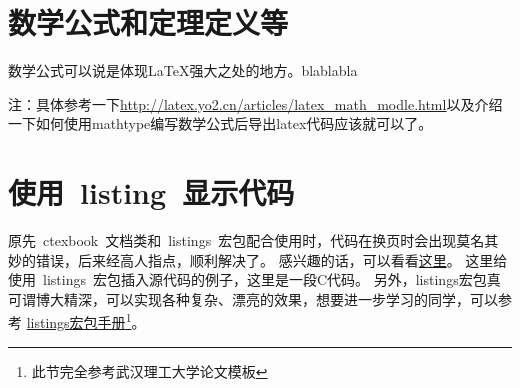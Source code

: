 \section{数学公式和定理定义等}
数学公式可以说是体现\LaTeX{}强大之处的地方。blablabla\par
注：具体参考一下\url{http://latex.yo2.cn/articles/latex_math_modle.html}以及介绍一下如何使用mathtype编写数学公式后导出latex代码应该就可以了。
\section{使用~listing~显示代码}
原先~ctexbook~文档类和~listings~宏包配合使用时，代码在换页时会出现莫名其妙的错误，后来经高人指点，顺利解决了。
感兴趣的话，可以看看\href{http://bbs.ctex.org/viewthread.php?tid=53451}{这里}。
这里给使用~listings~宏包插入源代码的例子，这里是一段C代码。
另外，listings宏包真可谓博大精深，可以实现各种复杂、漂亮的效果，想要进一步学习的同学，可以参考
\href{http://mirror.ctan.org/macros/latex/contrib/listings/listings.pdf}{listings宏包手册\footnote{此节完全参考武汉理工大学论文模板}}。